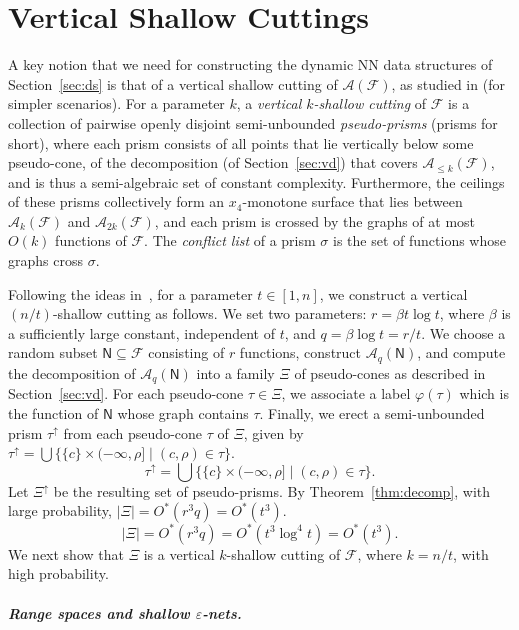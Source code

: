 \documentclass[11pt]{article}
\def\eps{{\varepsilon}}
\def\A{\mathcal{A}}
\def\F{\mathcal{F}}
\def\cell{\tau}
\def\NN{\mathsf{N}}
\def\Ak#1{\A_{{\le}#1}}
\theoremstyle{definition}
\begin{document}
\section{Vertical Shallow Cuttings} \label{sec:shallow}

A key notion that we need for constructing the dynamic NN data structures of Section~\ref{sec:ds}
is that of a vertical shallow cutting of $\A(\F)$, 
as studied in \cite{Chan:le,CT16,KMRSS} (for simpler scenarios). For a parameter $k$, a 
\emph{vertical $k$-shallow cutting} of $\F$ is a collection of pairwise openly disjoint 
semi-unbounded \emph{pseudo-prisms} (prisms for short), where each prism consists of all points 
that lie vertically below some pseudo-cone, of the decomposition (of Section~\ref{sec:vd}) 
that covers $\Ak{k} (\F)$,
and is thus a semi-algebraic set of constant complexity. 
Furthermore, the ceilings of these prisms collectively form an $x_4$-monotone surface that lies 
between $\A_k(\F)$ and $\A_{2k}(\F)$, and each prism is crossed by the graphs of at most 
$O(k)$ functions of $\F$. The \emph{conflict list} of a prism $\sigma$ is the set of 
functions whose graphs cross $\sigma$.

Following the ideas in~\cite{KMRSS}, for a parameter $t \in [1,n]$,
we construct a vertical $(n/t)$-shallow cutting as follows.
We set two parameters: $r=\beta t \log t$, where $\beta$ is a sufficiently large constant, independent
of $t$, and $q=\beta \log t = r/t$. We choose a random subset $\NN \subseteq \F$ consisting of $r$ functions,
construct $\A_q(\NN)$, and compute the decomposition of $\A_q(\NN)$ into a family $\Xi$ of pseudo-cones 
as described in Section~\ref{sec:vd}. For each pseudo-cone $\cell \in \Xi$, we associate a label 
$\varphi(\cell)$ which is the function of $\NN$ whose graph contains $\cell$. Finally, we erect a 
semi-unbounded prism $\cell^\uparrow$ from each pseudo-cone $\cell$ of $\Xi$, given by
\ifsocgproc
$\cell^\uparrow = \bigcup \{ \{c\} \times(-\infty, \rho] \mid (c,\rho) \in \cell\}$.
\else
\[
\cell^\uparrow = \bigcup \{ \{c\} \times(-\infty, \rho] \mid (c,\rho) \in \cell\}.
\] 
\fi
Let $\Xi^\uparrow$ be the resulting set of pseudo-prisms. By Theorem~\ref{thm:decomp}, with large probability,
\ifsocgproc
$|\Xi| = O^*(r^3q) =  O^*(t^3)$.
\else
\[
|\Xi| = O^*(r^3q) = O^*(t^3\log^4t) = O^*(t^3).
\]
\fi
We next show that $\Xi$ is a vertical $k$-shallow cutting of $\F$, where $k = n/t$, with high probability.

\ifsocgproc 
\subparagraph*{Range spaces and shallow $\eps$-nets.}
\else
\end{document}
